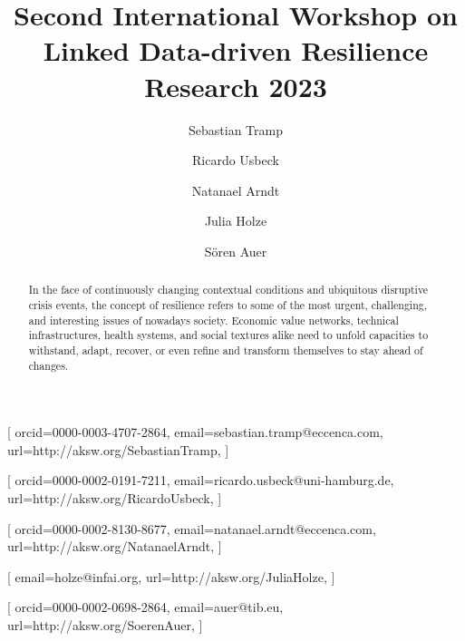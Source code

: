 \documentclass{ceurart}
\begin{document}


\title{Second International Workshop on\\ Linked Data-driven Resilience Research 2023}


\author[1]{Sebastian Tramp}[%
orcid=0000-0003-4707-2864,
email=sebastian.tramp@eccenca.com,
url=http://aksw.org/SebastianTramp,
]

\author[2]{Ricardo Usbeck}[%
orcid=0000-0002-0191-7211,
email=ricardo.usbeck@uni-hamburg.de,
url=http://aksw.org/RicardoUsbeck,
]
\author[1]{Natanael Arndt}[%
orcid=0000-0002-8130-8677,
email=natanael.arndt@eccenca.com,
url=http://aksw.org/NatanaelArndt,
]

\author[3]{Julia Holze}[%
email=holze@infai.org,
url=http://aksw.org/JuliaHolze,
]

\author[4]{Sören Auer}[%
orcid=0000-0002-0698-2864,
email=auer@tib.eu,
url=http://aksw.org/SoerenAuer,
]

\address[1]{eccenca GmbH, Hainstraße 8, 04109 Leipzig, Germany}

\address[2]{University of Hamburg}

\address[3]{Institut für Angewandte Informatik e.V., Goerdelerring 9, 04109 Leipzig, Germany}

\address[4]{Gottfried Wilhelm Leibniz University Hannover and Technische Informationsbibliothek (TIB)}


\begin{abstract}
In the face of continuously changing contextual conditions and ubiquitous disruptive crisis events, the concept of resilience refers to some of the most urgent, challenging, and interesting issues of nowadays society. Economic value networks, technical infrastructures, health systems, and social textures alike need to unfold capacities to withstand, adapt, recover, or even refine and transform themselves to stay ahead of changes.
\end{abstract}
\end{document}

